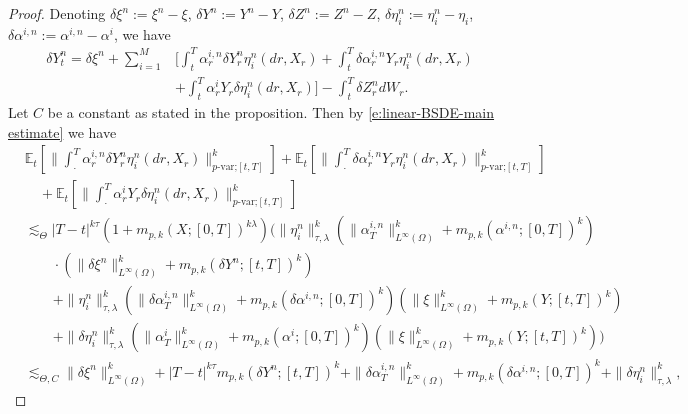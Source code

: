 \documentclass[11pt,reqno]{amsart}
\numberwithin{equation}{section}
\begin{document}
 
\begin{proof}
Denoting  $\delta \xi^{n} := \xi^{n} - \xi$, $\delta Y^{n} := Y^{n} - Y$, $\delta Z^{n} := Z^{n} - Z$, $\delta \eta^{n}_{i} := \eta^{n}_{i} - \eta_{i}$, $\delta \alpha^{i,n} := \alpha^{i,n} - \alpha^{i}$, we have
\begin{equation*}
\begin{aligned}
\delta Y^{n}_{t} = \delta\xi^{n} + \sum_{i=1}^{M}&\Big[\int_{t}^{T} \alpha^{i,n}_{r}\delta Y^{n}_{r}\eta^{n}_{i}(dr,X_{r}) + \int_{t}^{T}\delta \alpha^{i,n}_{r}Y_r\eta^{n}_{i}(dr,X_{r})\\
& + \int_{t}^{T}\alpha^{i}_{r}Y_{r}\delta \eta^{n}_{i}(dr,X_{r}) \Big] - \int_{t}^{T}\delta Z^{n}_{r} dW_{r}.
\end{aligned}
\end{equation*}
Let $C$ be a constant as stated in the proposition. Then by \eqref{e:linear-BSDE-main estimate} we have
\begin{align}\nonumber
&\mathbb{E}_{t} \left[ \Big\| \int_{\cdot}^{T} \alpha^{i,n}_{r}\delta Y^{n}_{r}\eta^{n}_{i}(dr,X_{r}) \Big\|^{k}_{p\text{-var;}[t,T]} \right] + \mathbb{E}_{t} \left[ \Big\| \int_{\cdot}^{T} \delta\alpha^{i,n}_{r} Y_{r}\eta^{n}_{i}(dr,X_{r}) \Big\|^{k}_{p\text{-var;}[t,T]} \right] \\ \nonumber
&\quad  + \mathbb{E}_{t} \left[ \Big\| \int_{\cdot}^{T}\alpha^{i}_{r}Y_{r}\delta \eta^{n}_{i}(dr,X_{r}) \Big\|^{k}_{p\text{-var;}[t,T]} \right]\\ \nonumber
&\lesssim_{\Theta} |T-t|^{k\tau}\left(1 + m_{p,k}(X;[0,T])^{k\lambda}\right)\bigg(\|\eta^{n}_{i}\|^{k}_{\tau,\lambda}\left(\|\alpha^{i,n}_{T}\|^k_{L^{\infty}(\Omega)} + m_{p,k}(\alpha^{i,n};[0,T])^k\right) \\ 
\label{e:continuity map-estimate 1} &\quad \quad \cdot \left( \|\delta \xi^{n}\|^{k}_{L^{\infty}(\Omega)} + m_{p,k}(\delta Y^{n};[t,T])^{k}\right)\\  
\nonumber 
& \quad\quad  + \|\eta^{n}_{i}\|^{k}_{\tau,\lambda}\left(\|\delta\alpha^{i,n}_{T}\|^k_{L^{\infty}(\Omega)} +  m_{p,k}(\delta\alpha^{i,n};[0,T])^k\right) \left(\|\xi\|^{k}_{L^{\infty}(\Omega)} + m_{p,k}(Y;[t,T])^{k}\right)\\ \nonumber
&\quad\quad     + \|\delta\eta^{n}_{i}\|^{k}_{\tau,\lambda}\left(\|\alpha^{i}_{T}\|^k_{L^{\infty}(\Omega)} + m_{p,k}(\alpha^{i};[0,T])^k\right)\left(\|\xi\|^{k}_{L^{\infty}(\Omega)} + m_{p,k}(Y;[t,T])^{k}\right)\bigg) \\ \nonumber
&\lesssim_{\Theta,C} \|\delta\xi^{n}\|^{k}_{L^{\infty}(\Omega)} + |T-t|^{k\tau}m_{p,k}(\delta Y^{n};[t,T])^{k} + \|\delta\alpha^{i,n}_{T}\|^k_{L^{\infty}(\Omega)}  +  m_{p,k}(\delta\alpha^{i,n};[0,T])^k + \|\delta \eta^{n}_{i}\|^{k}_{\tau,\lambda},

\end{align}
\end{proof}
\end{document}
